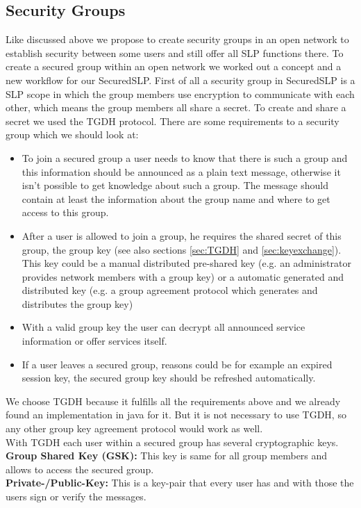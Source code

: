 \subsection{Security Groups}
Like discussed above we propose to create security groups in an open network to establish security between some users and still offer all SLP functions there. To create a secured group within an open network we worked out a concept and a new workflow for our SecuredSLP. First of all a security group in SecuredSLP is a SLP scope in which the group members use encryption to communicate with each other, which means the group members all share a secret. To create and share a secret we used the TGDH protocol. There are some requirements to a security group which we should look at:
\begin{itemize}
  \item To join a secured group a user needs to know that there is such a group and this information should be announced as a plain text message, otherwise it isn't possible to get knowledge about such a group. The message should contain at least the information about the group name and where to get access to this group.
  \item After a user is allowed to join a group, he requires the shared secret of this group, the group key (see also sections \ref{sec:TGDH} and \ref{sec:keyexchange}). This key could be a manual distributed pre-shared key (e.g. an administrator provides network members with a group key) or a automatic generated and distributed key (e.g. a group agreement protocol which generates and distributes the group key)
  \item With a valid group key the user can decrypt all announced service information or offer services itself.
  \item If a user leaves a secured group, reasons could be for example an expired session key, the secured group key should be refreshed automatically.
\end{itemize}
We choose TGDH because it fulfills all the requirements above and we already found an implementation in java for it. But it is not necessary to use TGDH, so any other group key agreement protocol would work as well.\\
With TGDH each user within a secured group has several cryptographic keys.\\
\textbf{Group Shared Key (GSK):} This key is same for all group members and allows to access the secured group.\\
\textbf{Private-/Public-Key:} This is a key-pair that every user has and with those the users sign or verify the messages.

